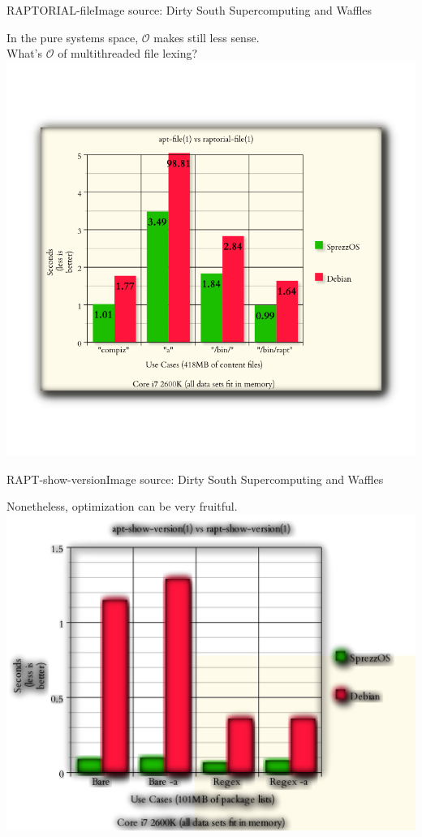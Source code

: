 \documentclass[mathserif,xcolor={dvipsnames,table}]{beamer}
\begin{document}
\begin{frame}{RAPTORIAL-file\hfill\tiny{Image source: Dirty South Supercomputing and Waffles}}
\begin{center}
In the pure systems space, $\mathcal{O}$ makes still less sense.\\
What's $\mathcal{O}$ of multithreaded file lexing?\\
\includegraphics[width=.675\paperwidth]{images/raptorial-file-fullsize.png}
\end{center}
\end{frame}

\begin{frame}{RAPT-show-version\hfill\tiny{Image source: Dirty South Supercomputing and Waffles}}
\begin{center}
Nonetheless, optimization can be very fruitful.
\includegraphics[width=.675\paperwidth]{images/rapt-show-versions-fullsize.png}
\end{center}
\end{frame}
\end{document}
